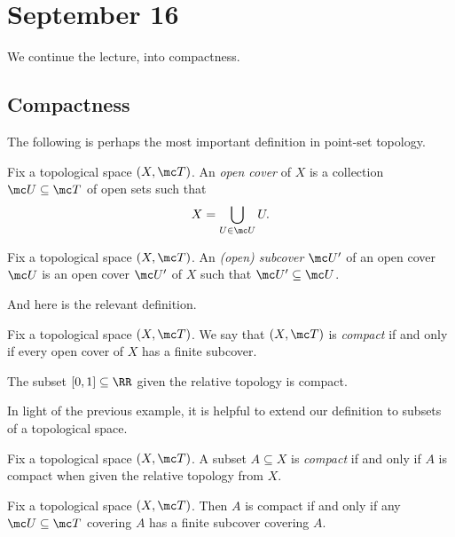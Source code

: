 \documentclass[../notes.tex]{subfiles}
\begin{document}
\section{September 16}

We continue the lecture, into compactness.

\subsection{Compactness}
The following is perhaps the most important definition in point-set topology.
\begin{definition}
	Fix a topological space $(X,\mc T)$. An \textit{open cover} of $X$ is a collection $\mc U\subseteq\mc T$ of open sets such that
	\[X=\bigcup_{U\in\mc U}U.\]
\end{definition}
\begin{definition}
	Fix a topological space $(X,\mc T)$. An \textit{(open) subcover} $\mc U'$ of an open cover $\mc U$ is an open cover $\mc U'$ of $X$ such that $\mc U'\subseteq\mc U$.
\end{definition}
And here is the relevant definition.
\begin{defi}[Compact]
	Fix a topological space $(X,\mc T)$. We say that $(X,\mc T)$ is \textit{compact} if and only if every open cover of $X$ has a finite subcover.
\end{defi}
\begin{example}
	The subset $[0,1]\subseteq\RR$ given the relative topology is compact.
\end{example}
In light of the previous example, it is helpful to extend our definition to subsets of a topological space.
\begin{definition}[Compact]
	Fix a topological space $(X,\mc T)$. A subset $A\subseteq X$ is \textit{compact} if and only if $A$ is compact when given the relative topology from $X$.
\end{definition}
\begin{lemma} \label{lem:bettercompactsubset}
	Fix a topological space $(X,\mc T)$. Then $A$ is compact if and only if any $\mc U\subseteq\mc T$ covering $A$ has a finite subcover covering $A$.
\end{lemma}
\end{document}
